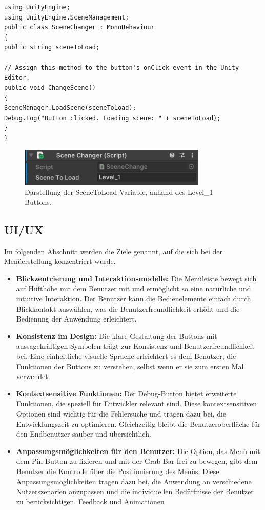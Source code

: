 \begin{lstlisting}[style=csharp, caption=Auf Knopfdruck Szene wechseln.]
using UnityEngine;
using UnityEngine.SceneManagement;
public class SceneChanger : MonoBehaviour
{
public string sceneToLoad;

// Assign this method to the button's onClick event in the Unity Editor.
public void ChangeScene()
{
SceneManager.LoadScene(sceneToLoad);
Debug.Log("Button clicked. Loading scene: " + sceneToLoad);
}
}
\end{lstlisting}

\begin{figure}[h]
\centering
\includegraphics[width=0.8\textwidth]{images/sceneToLoad.png}
\caption{Darstellung der SceneToLoad Variable, anhand des Level_1 Buttons.}
\label{fig:scenetoload}
\end{figure}

\subsection{UI/UX}
Im folgenden Abschnitt werden die Ziele genannt, auf die sich bei der Menüerstellung konzentriert wurde.
\begin{itemize}
\item \textbf{Blickzentrierung und Interaktionsmodelle:}
Die Menüleiste bewegt sich auf Hüfthöhe mit dem Benutzer mit und ermöglicht so eine natürliche und intuitive Interaktion.
Der Benutzer kann die Bedienelemente einfach durch Blickkontakt auswählen, was die Benutzerfreundlichkeit erhöht und die
Bedienung der Anwendung erleichtert.
\item \textbf{Konsistenz im Design:}
Die klare Gestaltung der Buttons mit aussagekräftigen Symbolen trägt zur Konsistenz und Benutzerfreundlichkeit bei.
Eine einheitliche visuelle Sprache erleichtert es dem Benutzer, die Funktionen der Buttons zu verstehen, selbst wenn er
sie zum ersten Mal verwendet.
\item \textbf{Kontextsensitive Funktionen:}
Der Debug-Button bietet erweiterte Funktionen, die speziell für Entwickler relevant sind. Diese kontextsensitiven
Optionen sind wichtig für die Fehlersuche und tragen dazu bei, die Entwicklungszeit zu optimieren. Gleichzeitig bleibt
die Benutzeroberfläche für den Endbenutzer sauber und übersichtlich.
\item \textbf{Anpassungsmöglichkeiten für den Benutzer:}
Die Option, das Menü mit dem Pin-Button zu fixieren und mit der Grab-Bar frei zu bewegen, gibt dem Benutzer die
Kontrolle über die Positionierung des Menüs. Diese Anpassungsmöglichkeiten tragen dazu bei, die Anwendung an
verschiedene Nutzerszenarien anzupassen und die individuellen Bedürfnisse der Benutzer zu berücksichtigen.
Feedback und Animationen
\end{itemize}

